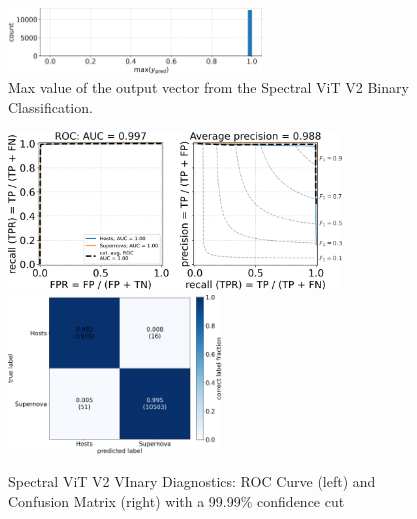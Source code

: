 \begin{figure}[b]
    \centering
    \includegraphics[width=0.6\textwidth]{figures/v2_real/vit_model_V2max_ypred_binary_26.png}
    \caption{Max value of the output vector from the Spectral ViT V2 Binary Classification.\label{fig:cnn_max}}
\end{figure}



\begin{figure}[t]
    \centering
    \includegraphics[height=4.2cm]{figures/v2_real/vit_model_V2roc9999_binary_e26.png}
    \quad
    \includegraphics[height=4.2cm]{figures/v2_real/vit_model_V2cm9999_binary_e26.png}
    \caption{Spectral ViT V2 VInary Diagnostics: ROC Curve (left) and Confusion Matrix (right) with a 99.99\% confidence
    cut \label{fig:cnn_qual}}
\end{figure}

